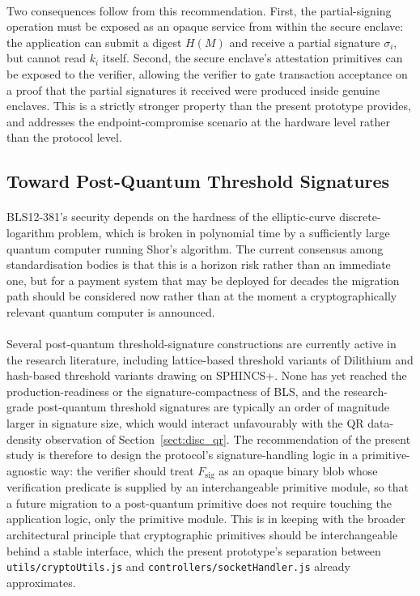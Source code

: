\paragraph{}Two consequences follow from this recommendation. First, the partial-signing operation must be exposed as an opaque service from within the secure enclave: the application can submit a digest $H(M)$ and receive a partial signature $\sigma_i$, but cannot read $k_i$ itself. Second, the secure enclave's attestation primitives can be exposed to the verifier, allowing the verifier to gate transaction acceptance on a proof that the partial signatures it received were produced inside genuine enclaves. This is a strictly stronger property than the present prototype provides, and addresses the endpoint-compromise scenario at the hardware level rather than the protocol level.

\subsection{Toward Post-Quantum Threshold Signatures}
\label{sect:rec_pqc}

\paragraph{}BLS12-381's security depends on the hardness of the elliptic-curve discrete-logarithm problem, which is broken in polynomial time by a sufficiently large quantum computer running Shor's algorithm. The current consensus among standardisation bodies is that this is a horizon risk rather than an immediate one, but for a payment system that may be deployed for decades the migration path should be considered now rather than at the moment a cryptographically relevant quantum computer is announced.

\paragraph{}Several post-quantum threshold-signature constructions are currently active in the research literature, including lattice-based threshold variants of Dilithium and hash-based threshold variants drawing on SPHINCS+. None has yet reached the production-readiness or the signature-compactness of BLS, and the research-grade post-quantum threshold signatures are typically an order of magnitude larger in signature size, which would interact unfavourably with the QR data-density observation of Section~\ref{sect:disc_qr}. The recommendation of the present study is therefore to design the protocol's signature-handling logic in a primitive-agnostic way: the verifier should treat $F_{\text{sig}}$ as an opaque binary blob whose verification predicate is supplied by an interchangeable primitive module, so that a future migration to a post-quantum primitive does not require touching the application logic, only the primitive module. This is in keeping with the broader architectural principle that cryptographic primitives should be interchangeable behind a stable interface, which the present prototype's separation between \texttt{utils/cryptoUtils.js} and \texttt{controllers/socketHandler.js} already approximates.


